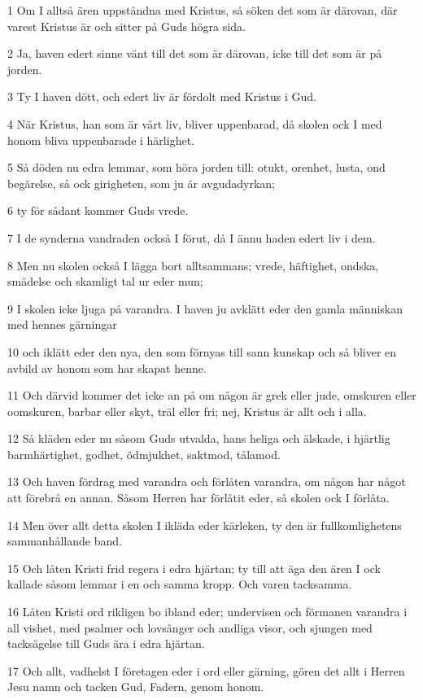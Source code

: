 \par 1 Om I alltså ären uppståndna med Kristus, så söken det som är därovan, där varest Kristus är och sitter på Guds högra sida.
\par 2 Ja, haven edert sinne vänt till det som är därovan, icke till det som är på jorden.
\par 3 Ty I haven dött, och edert liv är fördolt med Kristus i Gud.
\par 4 När Kristus, han som är vårt liv, bliver uppenbarad, då skolen ock I med honom bliva uppenbarade i härlighet.
\par 5 Så döden nu edra lemmar, som höra jorden till: otukt, orenhet, lusta, ond begärelse, så ock girigheten, som ju är avgudadyrkan;
\par 6 ty för sådant kommer Guds vrede.
\par 7 I de synderna vandraden också I förut, då I ännu haden edert liv i dem.
\par 8 Men nu skolen också I lägga bort alltsammans; vrede, häftighet, ondska, smädelse och skamligt tal ur eder mun;
\par 9 I skolen icke ljuga på varandra. I haven ju avklätt eder den gamla människan med hennes gärningar
\par 10 och iklätt eder den nya, den som förnyas till sann kunskap och så bliver en avbild av honom som har skapat henne.
\par 11 Och därvid kommer det icke an på om någon är grek eller jude, omskuren eller oomskuren, barbar eller skyt, träl eller fri; nej, Kristus är allt och i alla.
\par 12 Så kläden eder nu såsom Guds utvalda, hans heliga och älskade, i hjärtlig barmhärtighet, godhet, ödmjukhet, saktmod, tålamod.
\par 13 Och haven fördrag med varandra och förlåten varandra, om någon har något att förebrå en annan. Såsom Herren har förlåtit eder, så skolen ock I förlåta.
\par 14 Men över allt detta skolen I ikläda eder kärleken, ty den är fullkomlighetens sammanhållande band.
\par 15 Och låten Kristi frid regera i edra hjärtan; ty till att äga den ären I ock kallade såsom lemmar i en och samma kropp. Och varen tacksamma.
\par 16 Låten Kristi ord rikligen bo ibland eder; undervisen och förmanen varandra i all vishet, med psalmer och lovsånger och andliga visor, och sjungen med tacksägelse till Guds ära i edra hjärtan.
\par 17 Och allt, vadhelst I företagen eder i ord eller gärning, gören det allt i Herren Jesu namn och tacken Gud, Fadern, genom honom.
